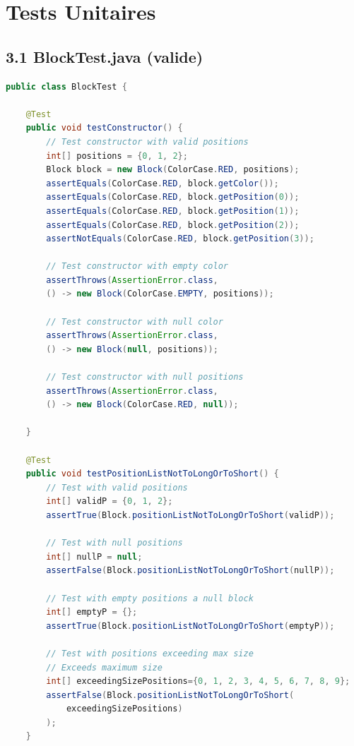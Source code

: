 \documentclass[a4paper,11pt]{article}
\begin{document}
\newpage
\section{Tests Unitaires}
\subsection{3.1 BlockTest.java (valide)}

\begin{lstlisting}[language=Java]
public class BlockTest {

    @Test
    public void testConstructor() {
        // Test constructor with valid positions
        int[] positions = {0, 1, 2};
        Block block = new Block(ColorCase.RED, positions);
        assertEquals(ColorCase.RED, block.getColor());
        assertEquals(ColorCase.RED, block.getPosition(0));
        assertEquals(ColorCase.RED, block.getPosition(1));
        assertEquals(ColorCase.RED, block.getPosition(2));
        assertNotEquals(ColorCase.RED, block.getPosition(3));

        // Test constructor with empty color
        assertThrows(AssertionError.class,
        () -> new Block(ColorCase.EMPTY, positions));
        
        // Test constructor with null color
        assertThrows(AssertionError.class,
        () -> new Block(null, positions));

        // Test constructor with null positions
        assertThrows(AssertionError.class,
        () -> new Block(ColorCase.RED, null));
        
    }

    @Test
    public void testPositionListNotToLongOrToShort() {
        // Test with valid positions
        int[] validP = {0, 1, 2};
        assertTrue(Block.positionListNotToLongOrToShort(validP));

        // Test with null positions
        int[] nullP = null;
        assertFalse(Block.positionListNotToLongOrToShort(nullP));

        // Test with empty positions a null block
        int[] emptyP = {};
        assertTrue(Block.positionListNotToLongOrToShort(emptyP));

        // Test with positions exceeding max size
        // Exceeds maximum size
        int[] exceedingSizePositions={0, 1, 2, 3, 4, 5, 6, 7, 8, 9}; 
        assertFalse(Block.positionListNotToLongOrToShort(
            exceedingSizePositions)
        );
    }



\end{lstlisting}
\end{document}
